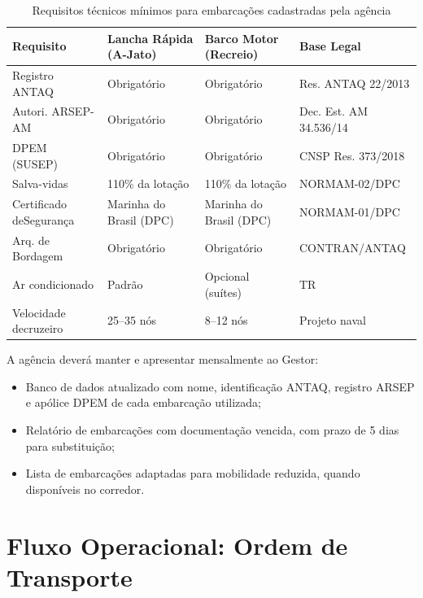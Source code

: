\documentclass[12pt,a4paper]{article}
\begin{document}
\begin{table}[H]\centering
\caption{Requisitos técnicos mínimos para embarcações cadastradas pela agência}
\small{}
\begin{tabular}{L{4.5cm} L{4.0cm} L{4.0cm} L{1.5cm}}
  \color{white}\textbf{Requisito} &
  \color{white}\textbf{Lancha Rápida (A-Jato)} &
  \color{white}\textbf{Barco Motor (Recreio)} &
  \color{white}\textbf{Base Legal} \\
  \toprule
  Registro ANTAQ   & Obrigatório & Obrigatório & Res. ANTAQ 22/2013 \\
  Autori. ARSEP-AM & Obrigatório & Obrigatório & Dec. Est. AM 34.536/14 \\
  DPEM (SUSEP)     & Obrigatório & Obrigatório & CNSP Res. 373/2018 \\
  Salva-vidas      & 110\% da lotação & 110\% da lotação & NORMAM-02/DPC \\
  Certificado de\newline Segurança &
    Marinha do Brasil (DPC) & Marinha do Brasil (DPC) & NORMAM-01/DPC \\
  Arq. de Bordagem & Obrigatório & Obrigatório & CONTRAN/ANTAQ \\
  Ar condicionado  & Padrão & Opcional (suítes) & TR \\
  Velocidade de\newline cruzeiro &
    25--35 nós & 8--12 nós & Projeto naval \\
  \bottomrule
\end{tabular}
\end{table}

A agência deverá manter e apresentar mensalmente ao Gestor:

\begin{itemize}
  \item Banco de dados atualizado com nome, identificação ANTAQ, registro
    ARSEP e apólice DPEM de cada embarcação utilizada;
  \item Relatório de embarcações com documentação vencida, com prazo de 5 dias
    para substituição;
  \item Lista de embarcações adaptadas para mobilidade reduzida, quando
    disponíveis no corredor.
\end{itemize}

\section{Fluxo Operacional: Ordem de Transporte}
\end{document}
